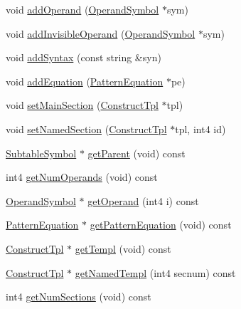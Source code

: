 \begin{DoxyCompactItemize}
\item 
void \mbox{\hyperlink{class_constructor_a68d3673f0b2a139ab0690b066fd8b3dd}{add\+Operand}} (\mbox{\hyperlink{class_operand_symbol}{Operand\+Symbol}} $\ast$sym)
\item 
void \mbox{\hyperlink{class_constructor_ad99b2273a274feb05ff73a2e71ed72c0}{add\+Invisible\+Operand}} (\mbox{\hyperlink{class_operand_symbol}{Operand\+Symbol}} $\ast$sym)
\item 
void \mbox{\hyperlink{class_constructor_afa84cb0958349a7e804bc269a83ac688}{add\+Syntax}} (const string \&syn)
\item 
void \mbox{\hyperlink{class_constructor_a28952428d219c38b0dc2a8c800c2c96e}{add\+Equation}} (\mbox{\hyperlink{class_pattern_equation}{Pattern\+Equation}} $\ast$pe)
\item 
void \mbox{\hyperlink{class_constructor_ab57dc6ff30aa37f1bc63d156edb42ae6}{set\+Main\+Section}} (\mbox{\hyperlink{class_construct_tpl}{Construct\+Tpl}} $\ast$tpl)
\item 
void \mbox{\hyperlink{class_constructor_a138cd50d73a4b5475b0ca28ed682f381}{set\+Named\+Section}} (\mbox{\hyperlink{class_construct_tpl}{Construct\+Tpl}} $\ast$tpl, int4 id)
\item 
\mbox{\hyperlink{class_subtable_symbol}{Subtable\+Symbol}} $\ast$ \mbox{\hyperlink{class_constructor_a613d5401723ad2cf2609431fafb29ccb}{get\+Parent}} (void) const
\item 
int4 \mbox{\hyperlink{class_constructor_a407d3e6d5d0168bfca04a389c5990ef0}{get\+Num\+Operands}} (void) const
\item 
\mbox{\hyperlink{class_operand_symbol}{Operand\+Symbol}} $\ast$ \mbox{\hyperlink{class_constructor_af59778488eafa4569c35b0c295be6f1f}{get\+Operand}} (int4 i) const
\item 
\mbox{\hyperlink{class_pattern_equation}{Pattern\+Equation}} $\ast$ \mbox{\hyperlink{class_constructor_aec435892cdb0a58e40c30f301dc73ced}{get\+Pattern\+Equation}} (void) const
\item 
\mbox{\hyperlink{class_construct_tpl}{Construct\+Tpl}} $\ast$ \mbox{\hyperlink{class_constructor_a7688528dd1486806b75cac5a0c968d75}{get\+Templ}} (void) const
\item 
\mbox{\hyperlink{class_construct_tpl}{Construct\+Tpl}} $\ast$ \mbox{\hyperlink{class_constructor_afa9add72555c1956fcd48a68b7ff5107}{get\+Named\+Templ}} (int4 secnum) const
\item 
int4 \mbox{\hyperlink{class_constructor_a335da57fe897b45b88acfd433b6338df}{get\+Num\+Sections}} (void) const

\end{DoxyCompactItemize}
